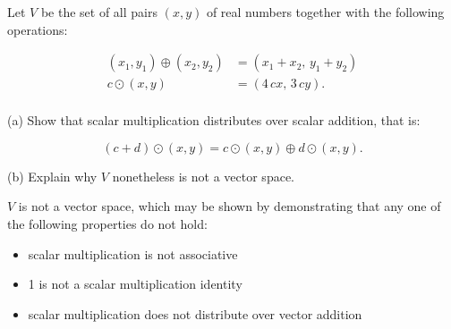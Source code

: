 
\begin{exerciseStatement}


 Let \(V\) be the set of all pairs \((x,y)\) of real numbers together with the following operations: 


\begin{align*} (x_1,y_1)\oplus (x_2,y_2)&= \left(x_{1} + x_{2},\,y_{1} + y_{2}\right)  \\c \odot (x,y) &= \left(4 \, c x,\,3 \, c y\right) . \\ \end{align*}
            

 (a) Show that scalar multiplication distributes over scalar addition, that is: 

\[(c+d)\odot(x,y)=c\odot(x,y)\oplus d\odot (x,y).
    \]

 (b) Explain why \(V\) nonetheless is not a vector space. 


\end{exerciseStatement}
    
\begin{exerciseAnswer} 


\(V\) is not a vector space, which may be shown by demonstrating that any one of the following properties do not hold: 


\begin{itemize}
\item scalar multiplication is not associative
\item 1 is not a scalar multiplication identity
\item scalar multiplication does not distribute over vector addition
\end{itemize}
    
\end{exerciseAnswer}
    
